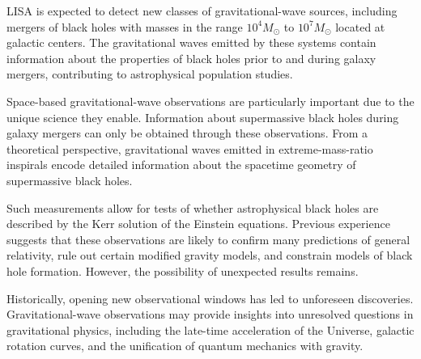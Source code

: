 LISA is expected to detect new classes of gravitational-wave sources, including mergers of black holes with masses in the range $10^4 M_\odot$ to $10^7 M_\odot$ located at galactic centers.
The gravitational waves emitted by these systems contain information about the properties of black holes prior to and during galaxy mergers, contributing to astrophysical population studies.


Space-based gravitational-wave observations are particularly important due to the unique science they enable.
Information about supermassive black holes during galaxy mergers can only be obtained through these observations.
From a theoretical perspective, gravitational waves emitted in extreme-mass-ratio inspirals encode detailed information about the spacetime geometry of supermassive black holes.


Such measurements allow for tests of whether astrophysical black holes are described by the Kerr solution of the Einstein equations.
Previous experience suggests that these observations are likely to confirm many predictions of general relativity, rule out certain modified gravity models, and constrain models of black hole formation.
However, the possibility of unexpected results remains.


Historically, opening new observational windows has led to unforeseen discoveries.
Gravitational-wave observations may provide insights into unresolved questions in gravitational physics, including the late-time acceleration of the Universe, galactic rotation curves, and the unification of quantum mechanics with gravity.


